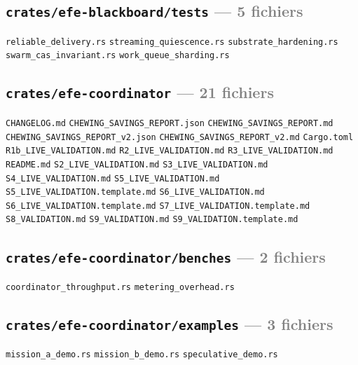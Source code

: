 \documentclass[10pt]{report}
\newcommand{\code}[1]{\texttt{\small #1}}
\begin{document}
\subsection*{\code{crates/efe-blackboard/tests} \normalfont\textcolor{grey}{--- 5 fichiers}}
\begin{sloppypar}\footnotesize\raggedright
\code{reliable\_delivery.rs} \;\textbullet\; \code{streaming\_quiescence.rs} \;\textbullet\; \code{substrate\_hardening.rs} \;\textbullet\; \code{swarm\_cas\_invariant.rs} \;\textbullet\; \code{work\_queue\_sharding.rs}
\end{sloppypar}

\subsection*{\code{crates/efe-coordinator} \normalfont\textcolor{grey}{--- 21 fichiers}}
\begin{sloppypar}\footnotesize\raggedright
\code{CHANGELOG.md} \;\textbullet\; \code{CHEWING\_SAVINGS\_REPORT.json} \;\textbullet\; \code{CHEWING\_SAVINGS\_REPORT.md} \;\textbullet\; \code{CHEWING\_SAVINGS\_REPORT\_v2.json} \;\textbullet\; \code{CHEWING\_SAVINGS\_REPORT\_v2.md} \;\textbullet\; \code{Cargo.toml} \;\textbullet\; \code{R1b\_LIVE\_VALIDATION.md} \;\textbullet\; \code{R2\_LIVE\_VALIDATION.md} \;\textbullet\; \code{R3\_LIVE\_VALIDATION.md} \;\textbullet\; \code{README.md} \;\textbullet\; \code{S2\_LIVE\_VALIDATION.md} \;\textbullet\; \code{S3\_LIVE\_VALIDATION.md} \;\textbullet\; \code{S4\_LIVE\_VALIDATION.md} \;\textbullet\; \code{S5\_LIVE\_VALIDATION.md} \;\textbullet\; \code{S5\_LIVE\_VALIDATION.template.md} \;\textbullet\; \code{S6\_LIVE\_VALIDATION.md} \;\textbullet\; \code{S6\_LIVE\_VALIDATION.template.md} \;\textbullet\; \code{S7\_LIVE\_VALIDATION.template.md} \;\textbullet\; \code{S8\_VALIDATION.md} \;\textbullet\; \code{S9\_VALIDATION.md} \;\textbullet\; \code{S9\_VALIDATION.template.md}
\end{sloppypar}

\subsection*{\code{crates/efe-coordinator/benches} \normalfont\textcolor{grey}{--- 2 fichiers}}
\begin{sloppypar}\footnotesize\raggedright
\code{coordinator\_throughput.rs} \;\textbullet\; \code{metering\_overhead.rs}
\end{sloppypar}

\subsection*{\code{crates/efe-coordinator/examples} \normalfont\textcolor{grey}{--- 3 fichiers}}
\begin{sloppypar}\footnotesize\raggedright
\code{mission\_a\_demo.rs} \;\textbullet\; \code{mission\_b\_demo.rs} \;\textbullet\; \code{speculative\_demo.rs}
\end{sloppypar}
\end{document}
